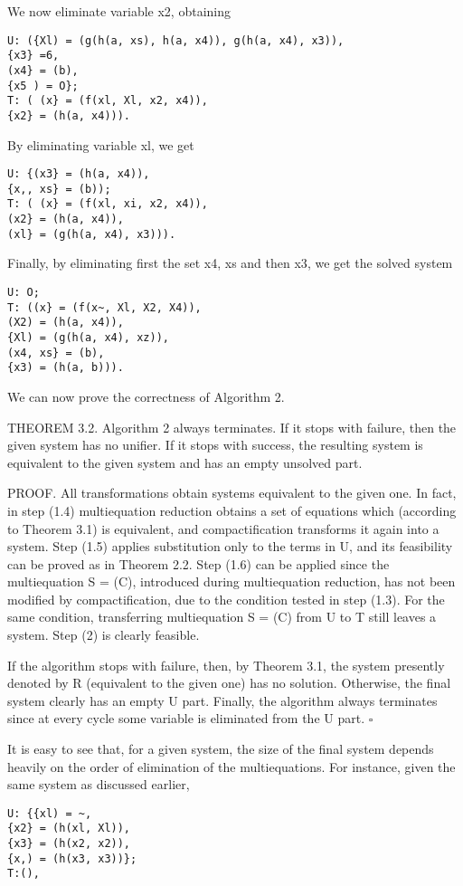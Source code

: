 We now eliminate variable x2, obtaining
\begin{verbatim}
U: ({Xl) = (g(h(a, xs), h(a, x4)), g(h(a, x4), x3)),
{x3} =6,
(x4} = (b),
{x5 ) = O};
T: ( (x} = (f(xl, Xl, x2, x4)),
{x2} = (h(a, x4))). 
\end{verbatim}

By eliminating variable xl, we get
\begin{verbatim}
U: {(x3} = (h(a, x4)),
{x,, xs} = (b));
T: ( (x} = (f(xl, xi, x2, x4)),
(x2} = (h(a, x4)),
(xl} = (g(h(a, x4), x3))). 
\end{verbatim}

Finally, by eliminating first the set {x4, xs} and then {x3}, we get the solved
system
\begin{verbatim}
U: O;
T: ((x} = (f(x~, Xl, X2, X4)),
(X2) = (h(a, x4)),
{Xl) = (g(h(a, x4), xz)),
(x4, xs} = (b),
{x3) = (h(a, b))). 
\end{verbatim}

We can now prove the correctness of Algorithm 2. 

THEOREM 3.2. Algorithm 2 always terminates. If it stops with failure, then
the given system has no unifier. If it stops with success, the resulting system is
equivalent to the given system and has an empty unsolved part.

PROOF. All transformations obtain systems equivalent to the given one. In fact,
in step (1.4) multiequation reduction obtains a set of equations which (according
to Theorem 3.1) is equivalent, and compactification transforms it again into a
system. Step (1.5) applies substitution only to the terms in U, and its feasibility
can be proved as in Theorem 2.2. Step (1.6) can be applied since the multiequation
S = (C), introduced during multiequation reduction, has not been modified by
compactification, due to the condition tested in step (1.3). For the same condition,
transferring multiequation S = (C) from U to T still leaves a system. Step (2) is
clearly feasible.

If the algorithm stops with failure, then, by Theorem 3.1, the system presently
denoted by R (equivalent to the given one) has no solution. Otherwise, the final
system clearly has an empty U part. Finally, the algorithm always terminates
since at every cycle some variable is eliminated from the U part. $\square$ 

It is easy to see that, for a given system, the size of the final system depends
heavily on the order of elimination of the multiequations. For instance, given the
same system as discussed earlier,
\begin{verbatim}
U: {{xl) = ~,
{x2} = (h(xl, Xl)),
{x3} = (h(x2, x2)),
{x,) = (h(x3, x3))};
T:(), 
\end{verbatim}

